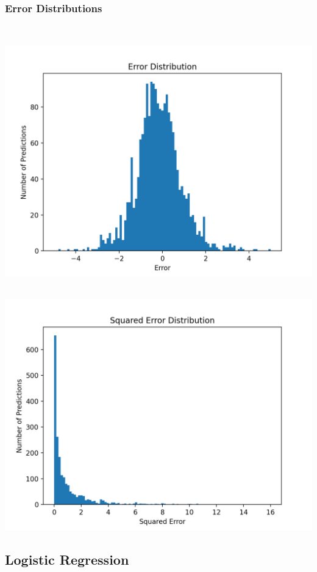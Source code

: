 \documentclass[11pt]{article}
\begin{document}
\subsubsection{Error Distributions}
\mbox{}\\
\begin{minipage}{0.45\textwidth}
\includegraphics[scale=0.5]{bert/error.png}
\end{minipage}
\hfill
\begin{minipage}{0.45\textwidth}
\mbox{}\\
\includegraphics[scale=0.5]{bert/squared_error.png}
\end{minipage}


\subsection{Logistic Regression}
\end{document}
